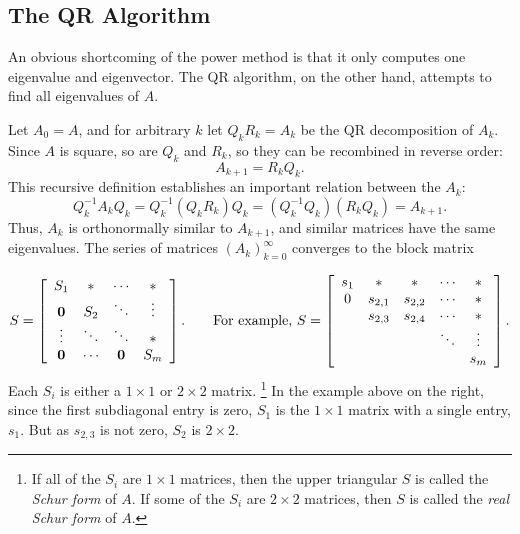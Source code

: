 \subsection*{The QR Algorithm} %

An obvious shortcoming of the power method is that it only computes one eigenvalue and eigenvector.
The QR algorithm, on the other hand, attempts to find all eigenvalues of $A$.

Let $A_0 = A$, and for arbitrary $k$ let $Q_kR_k = A_k$ be the QR decomposition of $A_k$.
Since $A$ is square, so are $Q_k$ and $R_k$, so they can be recombined in reverse order:
\[A_{k+1}=R_kQ_k.\]
This recursive definition establishes an important relation between the $A_k$:
\[Q_k^{-1}A_kQ_k = Q_k^{-1}(Q_kR_k)Q_k = (Q_k^{-1}Q_k)(R_kQ_k) = A_{k+1}.\]
Thus, $A_k$ is orthonormally similar to $A_{k+1}$, and similar matrices have the same eigenvalues.
The series of matrices $(A_k)_{k=0}^\infty$ converges to the block matrix

\[
S =
\left[\begin{array}{cccc}
S_1    & *      & \cdots & *      \\
\0     & S_2    & \ddots & \vdots \\
\vdots & \ddots & \ddots & *      \\
\0     & \cdots &     \0 & S_m
\end{array}\right].
\qquad
\text{For example,}\ S =
\left[\begin{array}{ccccc}
\arrayrulecolor{lightgray}
s_1 & *       & *       & \cdots & *      \\
0   & s_{2,1} & s_{2,2} & \cdots & *      \\
    & s_{2,3} & s_{2,4} & \cdots & *      \\
    &         &         & \ddots & \vdots \\
    &         &         &        & s_m    \\
\end{array}\right].
\]
Each $S_i$ is either a $1\times1$ or $2\times2$ matrix.%
\footnote{If all of the $S_i$ are $1\times1$ matrices, then the upper triangular $S$ is called the \emph{Schur form} of $A$.
If some of the $S_i$ are $2\times2$ matrices, then $S$ is called the \emph{real Schur form} of $A$.}
In the example above on the right, since the first subdiagonal entry is zero, $S_1$ is the $1\times 1$ matrix with a single entry, $s_1$.
But as $s_{2,3}$ is not zero, $S_2$ is $2\times 2$.

